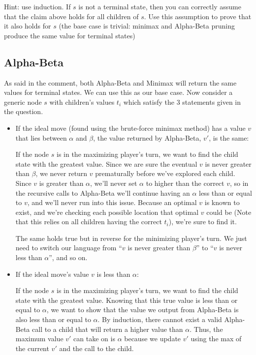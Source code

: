 \documentclass[11pt]{article}
\begin{document}
\noindent Hint: use induction. If $s$ is not a terminal state, then you can correctly assume that the claim above holds for all children of $s$. Use this assumption to prove that it also holds for $s$ (the base case is trivial: minimax and Alpha-Beta pruning produce the same value for terminal states)\newpage

\subsection*{Alpha-Beta}
As said in the comment, both Alpha-Beta and Minimax will return the same values for terminal states. We can use this as our base case. Now consider a generic node $s$ with children's values $t_i$ which satisfy the 3 statements given in the question.

\begin{itemize}
\item If the ideal move (found using the brute-force minimax method) has a value $v$ that lies between $\alpha$ and $\beta$, the value returned by Alpha-Beta, $v'$, is the same:

If the node $s$ is in the maximizing player's turn, we want to find the child state with the greatest value. Since we are sure the eventual $v$ is never greater than $\beta$, we never return $v$ prematurally before we've explored each child. Since $v$ is greater than $\alpha$, we'll never set $\alpha$ to higher than the correct $v$, so in the recursive calls to Alpha-Beta we'll continue having an $\alpha$ less than or equal to $v$, and we'll never run into this issue. Because an optimal $v$ is known to exist, and we're checking each possible location that optimal $v$ could be (Note that this relies on all children having the correct $t_i$), we're sure to find it.

The same holds true but in reverse for the minimizing player's turn. We just need to switch our language from ``$v$ is never greater than $\beta$'' to ``$v$ is never less than $\alpha$'', and so on.

\item If the ideal move's value $v$ is less than $\alpha$:

If the node $s$ is in the maximizing player's turn, we want to find the child state with the greatest value. Knowing that this true value is less than or equal to $\alpha$, we want to show that the value we output from Alpha-Beta is also less than or equal to $\alpha$. By induction, there cannot exist a valid Alpha-Beta call to a child that will return a higher value than $\alpha$. Thus, the maximum value $v'$ can take on is $\alpha$ because we update $v'$ using the max of the current $v'$ and the call to the child.


\end{itemize}
\end{document}

